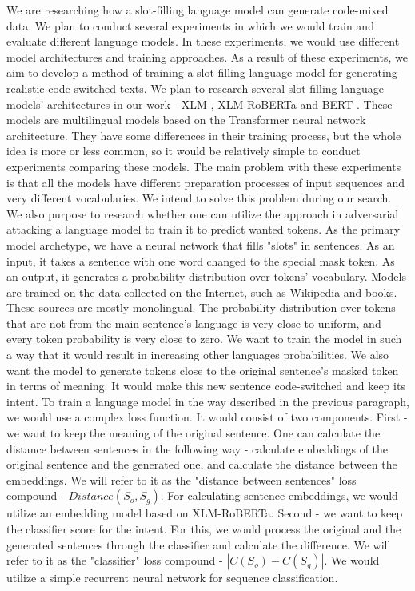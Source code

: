 \documentclass[conference]{IEEEtran}
\begin{document}
We are researching how a slot-filling language model can generate code-mixed data. We plan to conduct several experiments in which we would train and evaluate different language models. In these experiments, we would use different model architectures and training approaches. As a result of these experiments, we aim to develop a method of training a slot-filling language model for generating realistic code-switched texts.
\newline\indent We plan to research several slot-filling language models' architectures in our work - XLM \cite{xlm}, XLM-RoBERTa \cite{xlmr} and BERT \cite{bert}. These models are multilingual models based on the Transformer neural network architecture. They have some differences in their training process, but the whole idea is more or less common, so it would be relatively simple to conduct experiments comparing these models. The main problem with these experiments is that all the models have different preparation processes of input sequences and very different vocabularies. We intend to solve this problem during our search.
\newline\indent We also purpose to research whether one can utilize the \cite{dilma} approach in adversarial attacking a language model to train it to predict wanted tokens. As the primary model archetype, we have a neural network that fills "slots" in sentences. As an input, it takes a sentence with one word changed to the special mask token. As an output, it generates a probability distribution over tokens' vocabulary. Models are trained on the data collected on the Internet, such as Wikipedia and books. These sources are mostly monolingual. The probability distribution over tokens that are not from the main sentence's language is very close to uniform, and every token probability is very close to zero. We want to train the model in such a way that it would result in increasing other languages probabilities. We also want the model to generate tokens close to the original sentence's masked token in terms of meaning. It would make this new sentence code-switched and keep its intent.
\newline\indent To train a language model in the way described in the previous paragraph, we would use a complex loss function. It would consist of two components. First - we want to keep the meaning of the original sentence. One can calculate the distance between sentences in the following way - calculate embeddings of the original sentence and the generated one, and calculate the distance between the embeddings.  We will refer to it as the "distance between sentences" loss compound - $Distance(S_{o}, S_{g})$. For calculating sentence embeddings, we would utilize an embedding model based on XLM-RoBERTa. Second - we want to keep the classifier score for the intent. For this, we would process the original and the generated sentences through the classifier and calculate the difference. We will refer to it as the "classifier" loss compound - $\left| C(S_{o}) - C(S_{g}) \right|$. We would utilize a simple recurrent neural network for sequence classification.
\end{document}
